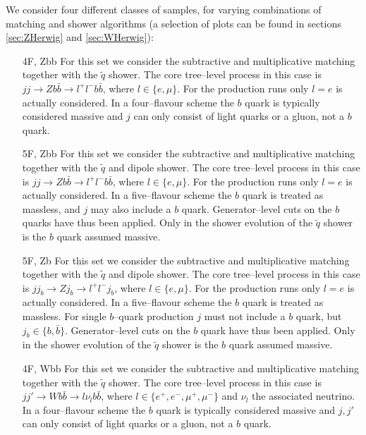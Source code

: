 \documentclass[11pt]{cernrep}
\begin{document}
We consider four different classes of samples, for varying combinations of
matching and shower algorithms (a selection of plots can be found in sections
\ref{sec:ZHerwig} and \ref{sec:WHerwig}):
\begin{itemize}
\item[4F, Zbb] For this set we consider the subtractive and multiplicative
  matching together with the $\tilde{q}$ shower.  The core tree--level
  process in this case is $jj \to Z b\bar{b} \to l^+ l^- b\bar{b}$, where $l
  \in \{e, \mu\}$. For the production runs only $l=e$ is actually considered.
  In a four--flavour scheme the $b$ quark is typically considered massive and
  $j$ can only consist of light quarks or a gluon, not a $b$ quark.
\item[5F, Zbb] For this set we consider the subtractive and multiplicative
  matching together with the $\tilde{q}$ and dipole shower.  The core
  tree--level process in this case is $jj \to Z b\bar{b} \to l^+ l^-
  b\bar{b}$, where $l \in \{e, \mu\}$. For the production runs only $l=e$ is
  actually considered.  In a five--flavour scheme the $b$ quark is treated as
  massless, and $j$ may also include a $b$ quark.  Generator--level cuts on
  the $b$ quarks have thus been applied.  Only in the shower evolution of the
  $\tilde{q}$ shower is the $b$ quark assumed massive.
\item[5F, Zb] For this set we consider the subtractive and multiplicative
  matching together with the $\tilde{q}$ and dipole shower.  The core
  tree--level process in this case is $jj_b \to Z j_b \to l^+ l^- j_b$, where
  $l \in \{e, \mu\}$. For the production runs only $l=e$ is actually
  considered.  In a five--flavour scheme the $b$ quark is treated as
  massless.  For single $b$--quark production $j$ must not include a $b$
  quark, but $j_b \in \{b,\bar{b}\}$.  Generator--level cuts on the $b$ quark
  have thus been applied.  Only in the shower evolution of the $\tilde{q}$
  shower is the $b$ quark assumed massive.
\item[4F, Wbb] For this set we consider the subtractive and multiplicative
  matching together with the $\tilde{q}$ shower.  The core tree--level
  process in this case is $jj' \to W b\bar{b} \to l \nu_l b\bar{b}$, where $l
  \in \{e^+, e^-, \mu^+, \mu^-\}$ and $\nu_l$ the associated neutrino.  In a
  four--flavour scheme the $b$ quark is typically considered massive and
  $j,j'$ can only consist of light quarks or a gluon, not a $b$ quark.
\end{itemize}
\end{document}
